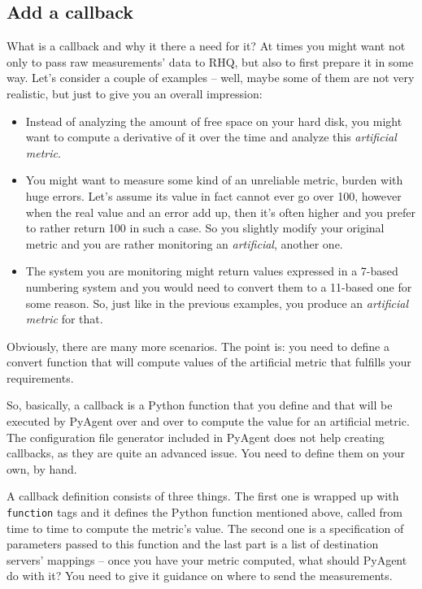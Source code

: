 \documentclass[a4paper,twoside,11pt]{article}
\begin{document}
		\subsection{Add a callback}

			What is a callback and why it there a need for it? At times you might want not only to pass raw measurements' data to RHQ, but also to first prepare it in some way. Let's consider a couple of examples -- well, maybe some of them are not very realistic, but just to give you an overall impression:
			\begin{itemize}
				\item Instead of analyzing the amount of free space on your hard disk, you might want to compute a derivative of it over the time and analyze this \emph{artificial metric}.
				\item You might want to measure some kind of an unreliable metric, burden with huge errors. Let's assume its value in fact cannot ever go over 100, however when the real value and an error add up, then it's often higher and you prefer to rather return 100 in such a case. So you slightly modify your original metric and you are rather monitoring an \emph{artificial}, another one.
				\item The system you are monitoring might return values expressed in a 7-based numbering system and you would need to convert them to a 11-based one for some reason. So, just like in the previous examples, you produce an \emph{artificial metric} for that.
			\end{itemize}
			Obviously, there are many more scenarios. The point is: you need to define a convert function that will compute values of the artificial metric that fulfills your requirements.
				
			So, basically, a callback is a Python function that you define and that will be executed by PyAgent over and over to compute the value for an artificial metric. The configuration file generator included in PyAgent does not help creating callbacks, as they are quite an advanced issue. You need to define them on your own, by hand.

			A callback definition consists of three things. The first one is wrapped up with \texttt{function} tags and it defines the Python function mentioned above, called from time to time to compute the metric's value. The second one is a specification of parameters passed to this function and the last part is a list of destination servers' mappings -- once you have your metric computed, what should PyAgent do with it? You need to give it guidance on where to send the measurements.
\end{document}
